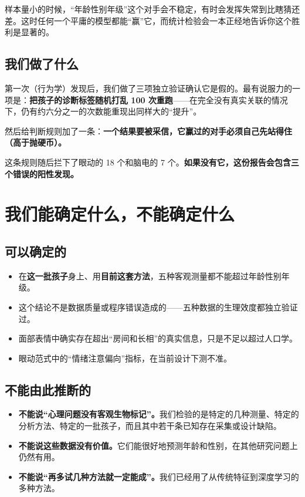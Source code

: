 \documentclass[UTF8,12pt,a4paper]{ctexart}
\newcommand{\key}[1]{\textbf{\textcolor{blue!45!black}{#1}}}
\begin{document}
样本量小的时候，“年龄性别年级”这个对手会不稳定，有时会发挥失常到比瞎猜还差。这时任何一个平庸的模型都能“赢”它，而统计检验会一本正经地告诉你这个胜利是显著的。

\subsection{我们做了什么}

第一次（行为学）发现后，我们做了三项独立验证确认它是假的。最有说服力的一项是：\key{把孩子的诊断标签随机打乱 100 次重跑}——在完全没有真实关联的情况下，仍有约六分之一的次数能重现出同样大的“提升”。

然后给判断规则加了一条：\key{一个结果要被采信，它赢过的对手必须自己先站得住（高于抛硬币）。}

这条规则随后拦下了眼动的 18 个和脑电的 7 个。\key{如果没有它，这份报告会包含三个错误的阳性发现。}

\section{我们能确定什么，不能确定什么}

\subsection{可以确定的}

\begin{itemize}
\item 在\key{这一批孩子}身上、用\key{目前这套方法}，五种客观测量都不能超过年龄性别年级。
\item 这个结论不是数据质量或程序错误造成的——五种数据的生理效度都独立验证过。
\item 面部表情中确实存在超出“房间和长相”的真实信息，只是不足以超过人口学。
\item 眼动范式中的“情绪注意偏向”指标，在当前设计下测不准。
\end{itemize}

\subsection{不能由此推断的}

\begin{itemize}
\item \key{不能说“心理问题没有客观生物标记”。}我们检验的是特定的几种测量、特定的分析方法、特定的一批孩子，而且其中若干条已知存在采集或设计缺陷。
\item \key{不能说这些数据没有价值。}它们能很好地预测年龄和性别，在其他研究问题上仍然有用。
\item \key{不能说“再多试几种方法就一定能成”。}我们已经用了从传统特征到深度学习的多种方法。
\end{itemize}
\end{document}
